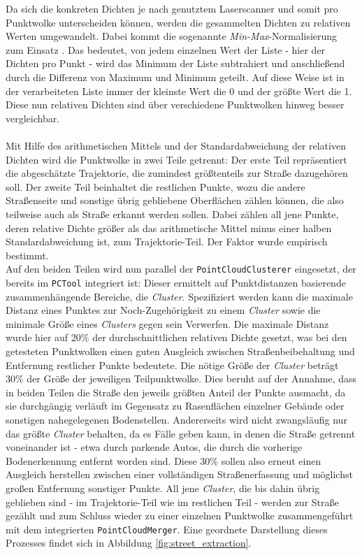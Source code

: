 Da sich die konkreten Dichten je nach genutztem Laserscanner und somit pro Punktwolke unterscheiden können, werden die gesammelten Dichten zu relativen Werten umgewandelt. Dabei kommt die sogenannte \textit{Min-Max}-Normalisierung zum Einsatz \citep{Patro.Sahu-2015}. Das bedeutet, von jedem einzelnen Wert der Liste - hier der Dichten pro Punkt - wird das Minimum der Liste subtrahiert und anschließend durch die Differenz von Maximum und Minimum geteilt. Auf diese Weise ist in der verarbeiteten Liste immer der kleinste Wert die 0 und der größte Wert die 1. Diese nun relativen Dichten sind über verschiedene Punktwolken hinweg besser vergleichbar. \\\\
Mit Hilfe des arithmetischen Mittels und der Standardabweichung der relativen Dichten wird die Punktwolke in zwei Teile getrennt: Der erste Teil repräsentiert die abgeschätzte Trajektorie, die zumindest größtenteils zur Straße dazugehören soll. Der zweite Teil beinhaltet die restlichen Punkte, wozu die andere Straßenseite und sonstige übrig gebliebene Oberflächen zählen können, die also teilweise auch als Straße erkannt werden sollen. Dabei zählen all jene Punkte, deren relative Dichte größer als das arithmetische Mittel minus einer halben Standardabweichung ist, zum Trajektorie-Teil. Der Faktor wurde empirisch bestimmt. \\
Auf den beiden Teilen wird nun parallel der \texttt{PointCloudClusterer} eingesetzt, der bereits im \texttt{PCTool} integriert ist: Dieser ermittelt auf Punktdistanzen basierende zusammenhängende Bereiche, die \textit{Cluster}. Spezifiziert werden kann die maximale Distanz eines Punktes zur Noch-Zugehörigkeit zu einem \textit{Cluster} sowie die minimale Größe eines \textit{Clusters} gegen sein Verwerfen. 
Die maximale Distanz wurde hier auf 20\% der durchschnittlichen relativen Dichte gesetzt, was bei den getesteten Punktwolken einen guten Ausgleich zwischen Straßenbeibehaltung und Entfernung restlicher Punkte bedeutete. Die nötige Größe der \textit{Cluster} beträgt 30\% der Größe der jeweiligen Teilpunktwolke. Dies beruht auf der Annahme, dass in beiden Teilen die Straße den jeweils größten Anteil der Punkte ausmacht, da sie durchgängig verläuft im Gegensatz zu Rasenflächen einzelner Gebäude oder sonstigen nahegelegenen Bodenstellen. Andererseits wird nicht zwangsläufig nur das größte \textit{Cluster} behalten, da es Fälle geben kann, in denen die Straße getrennt voneinander ist - etwa durch parkende Autos, die durch die vorherige Bodenerkennung entfernt worden sind. Diese 30\% sollen also erneut einen Ausgleich herstellen zwischen einer vollständigen Straßenerfassung und möglichst großen Entfernung sonstiger Punkte. All jene \textit{Cluster}, die bis dahin übrig geblieben sind - im Trajektorie-Teil wie im restlichen Teil - werden zur Straße gezählt und zum Schluss wieder zu einer einzelnen Punktwolke zusammengeführt mit dem integrierten \texttt{PointCloudMerger}. Eine geordnete Darstellung dieses Prozesses findet sich in Abbildung \ref{fig:street_extraction}.

